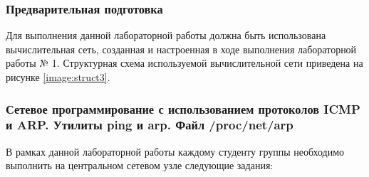 
\subsubsection{Предварительная подготовка}

Для выполнения данной лабораторной работы должна быть использована вычислительная сеть, созданная и настроенная в ходе выполнения лабораторной работы № 1.
Структурная схема используемой вычислительной сети приведена на рисунке \ref{image:struct3}.


\subsubsection{Сетевое программирование с использованием протоколов ICMP и ARP. Утилиты ping и arp. Файл /proc/net/arp}
\label{task:l3t1}

	В рамках данной лабораторной работы каждому студенту группы необходимо выполнить на центральном сетевом узле
	следующие задания:

